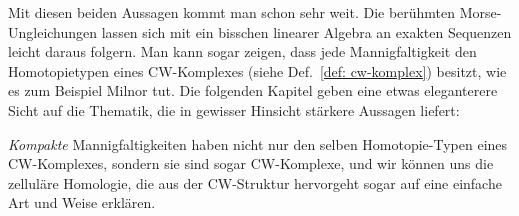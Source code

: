 Mit diesen beiden Aussagen kommt man schon sehr weit. Die berühmten Morse- \\Ungleichungen lassen
sich mit ein bisschen linearer Algebra an exakten Sequenzen leicht daraus folgern. Man kann sogar
zeigen, dass jede Mannigfaltigkeit den Homotopietypen eines CW-Komplexes 
(siehe Def.~\ref{def: cw-komplex}) besitzt, wie es zum Beispiel Milnor tut. Die folgenden Kapitel 
geben eine etwas eleganterere Sicht auf die Thematik, die in gewisser Hinsicht stärkere Aussagen
liefert:

\textit{Kompakte} Mannigfaltigkeiten haben nicht nur den selben Homotopie-Typen eines CW-Komplexes, 
sondern sie sind sogar CW-Komplexe, und wir können uns die zelluläre Homologie, die aus der 
CW-Struktur hervorgeht sogar auf eine einfache Art und Weise erklären.